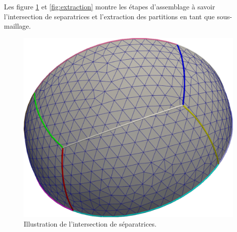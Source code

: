 Les figure \ref{fig:intersection_space} et \ref{fig:extraction} montre les étapes d'assemblage à savoir l'intersection de separatrices et l'extraction des partitions en tant que sous- maillage.\\

\begin{figure}[!h]
  \centering
  \includegraphics[scale=0.235]{images/intersection_space.pdf}
  \caption{Illustration de l'intersection de séparatrices.}
  \label{fig:intersection_space}
\end{figure}

